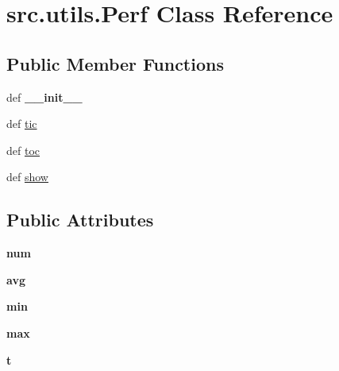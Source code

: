 \hypertarget{classsrc_1_1utils_1_1_perf}{\section{src.\-utils.\-Perf \-Class \-Reference}
\label{classsrc_1_1utils_1_1_perf}
}
\subsection*{\-Public \-Member \-Functions}
\begin{DoxyCompactItemize}
\item 
\hypertarget{classsrc_1_1utils_1_1_perf_af06e430d923b5e2bc80df094a00bb299}{def {\bfseries \-\_\-\-\_\-init\-\_\-\-\_\-}}\label{classsrc_1_1utils_1_1_perf_af06e430d923b5e2bc80df094a00bb299}

\item 
def \hyperlink{classsrc_1_1utils_1_1_perf_a00c0cd329e14f84b6d0364df9818722b}{tic}
\item 
def \hyperlink{classsrc_1_1utils_1_1_perf_ac407fd871c1580b65d5d8267abc680ef}{toc}
\item 
def \hyperlink{classsrc_1_1utils_1_1_perf_a6274b7f272bc8565aeb74da9bd63d318}{show}
\end{DoxyCompactItemize}
\subsection*{\-Public \-Attributes}
\begin{DoxyCompactItemize}
\item 
\hypertarget{classsrc_1_1utils_1_1_perf_a0dac804c4118f636fd52780aaac8e93d}{{\bfseries num}}\label{classsrc_1_1utils_1_1_perf_a0dac804c4118f636fd52780aaac8e93d}

\item 
\hypertarget{classsrc_1_1utils_1_1_perf_a3cf02cd12f61f6801e933a36a9992d0c}{{\bfseries avg}}\label{classsrc_1_1utils_1_1_perf_a3cf02cd12f61f6801e933a36a9992d0c}

\item 
\hypertarget{classsrc_1_1utils_1_1_perf_a34a439ab63770608c6f9431eae32ee52}{{\bfseries min}}\label{classsrc_1_1utils_1_1_perf_a34a439ab63770608c6f9431eae32ee52}

\item 
\hypertarget{classsrc_1_1utils_1_1_perf_acdb56148d65d04930922750ac9b3605f}{{\bfseries max}}\label{classsrc_1_1utils_1_1_perf_acdb56148d65d04930922750ac9b3605f}

\item 
\hypertarget{classsrc_1_1utils_1_1_perf_aaa7b9ac704680d70455b369733a2c7b6}{{\bfseries t}}\label{classsrc_1_1utils_1_1_perf_aaa7b9ac704680d70455b369733a2c7b6}

\end{DoxyCompactItemize}


